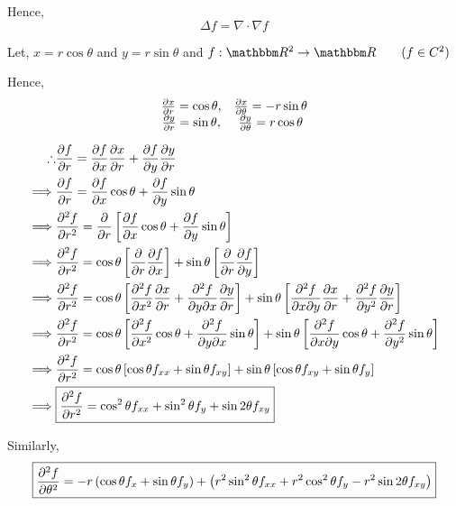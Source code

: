 \documentclass[Analysis-3]{subfiles}
\begin{document}
Hence, \[\boxed{\Delta f = \nabla\cdot\nabla f}\]

Let, $x = r\cos{\theta}$ and $y= r\sin{\theta}$ and $f : \R^2 \to \R \qquad ( f \in C^2) $

Hence,
\[\begin{matrix}
		\pdv{x}{r} = \cos{\theta}, & \pdv{x}{\theta} = -r\sin{\theta} \\
		\pdv{y}{r} = \sin{\theta}, & \pdv{y}{\theta} = r\cos{\theta}
	\end{matrix}\]

\begin{align*}
	\therefore & \pdv{f}{r} = \pdv{f}{x} \pdv{x}{r} + \pdv{f}{y}\pdv{y}{r}                                                                                                                               \\
	\implies   & \pdv{f}{r} = \pdv{f}{x} \cos{\theta} + \pdv{f}{y}\sin{\theta}                                                                                                                           \\
	\implies   & \pdv[2]{f}{r} = \pdv{}{r} \left[\pdv{f}{x} \cos{\theta} + \pdv{f}{y} \sin{\theta} \right]                                                                                               \\
	\implies   & \pdv[2]{f}{r} = \cos{\theta} \left[\pdv{}{r} \pdv{f}{x}\right] + \sin{\theta} \left[\pdv{}{r} \pdv{f}{y} \right]                                                                        \\
	\implies   & \pdv[2]{f}{r} = \cos{\theta} \left[\pdv[2]{f}{x} \pdv{x}{r} + \pdv{f}{y}{x} \pdv{y}{r} \right] + \sin{\theta} \left[\pdv{f}{x}{y} \pdv{x}{r} + \pdv[2]{f}{y} \pdv{y}{r} \right]         \\
	\implies   & \pdv[2]{f}{r} = \cos{\theta} \left[\pdv[2]{f}{x} \cos{\theta} + \pdv{f}{y}{x} \sin{\theta} \right] + \sin{\theta} \left[\pdv{f}{x}{y} \cos{\theta} + \pdv[2]{f}{y} \sin{\theta} \right] \\
	\implies   & \pdv[2]{f}{r} = \cos{\theta} \left[\cos{\theta} f_{xx} + \sin{\theta} f_{xy} \right] + \sin{\theta} \left[\cos{\theta} f_{xy} + \sin{\theta} f_{y} \right]                              \\
	\implies   & \boxed{\pdv[2]{f}{r} = \cos^2 \theta f_{xx} + \sin^2 \theta f_{y} + \sin 2 \theta f_{xy}}
\end{align*}


Similarly, \[ \boxed{\pdv[2]{f}{\theta} = -r \left( \cos{\theta} f_x + \sin{\theta} f_y \right) + \left( r^2\sin^2 \theta f_{xx} + r^2\cos^2 \theta f_{y} - r^2\sin 2 \theta f_{xy} \right)} \]
\end{document}
